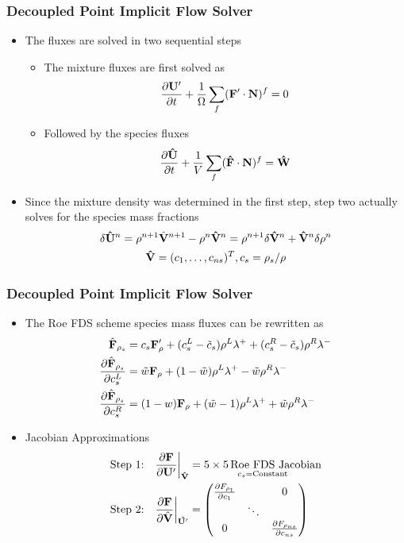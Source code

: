 \documentclass{beamer}
\begin{document}
\begin{frame}
  \frametitle{Decoupled Point Implicit Flow Solver}
  \begin{itemize}
    \item The fluxes are solved in two sequential steps
      \begin{itemize}
        \item  The mixture fluxes are first solved as
        \[
          \frac{\partial \mathbf U'}{\partial t} +
          \frac{1}{\Omega}\sum\limits_{f}(\mathbf F'\cdot\mathbf{N})^f = 0
        \]
      \item Followed by the species fluxes
      \[
        \frac{\partial \mathbf{\hat{U}}}{\partial t} +
        \frac{1}{V}\sum\limits_{f}(\mathbf{\hat{F}}\cdot \mathbf{N})^f =
        \mathbf{\hat{W}}
      \]
    \end{itemize}
    \item Since the mixture density was determined in the first step, step two
      actually solves for the species mass fractions
      \begin{gather*}
        \delta \mathbf{\hat{U}}^n 
        = \rho^{n+1} \hat{\mathbf V}^{n+1}-\rho^n\mathbf{\hat{V}}^n = \rho^{n+1} \delta
        \mathbf{\hat{V}}^n + \mathbf{\hat{V}}^n \delta \rho^n \\
        \mathbf{\hat{V}}=(c_1,\hdots,c_{ns})^T, c_s=\rho_s/\rho
      \end{gather*}
  \end{itemize}
\end{frame}
\begin{frame}
  \frametitle{Decoupled Point Implicit Flow Solver}
  \begin{itemize}
    \item The Roe FDS scheme species mass fluxes can be rewritten as
      \begin{align*}
  	\hat{\mathbf F}_{\rho_s} &= c_s \mathbf F'_\rho+(c_s^L-\tilde{c}_s)\rho^L\lambda^+
  	+ (c_s^R-\tilde{c}_s)\rho^R\lambda^- \\
	\frac{\partial \hat{\mathbf F}_{\rho_s}}{\partial c_s^L} 
	&= \tilde{w} \mathbf F_\rho+(1-\tilde{w})\rho^L\lambda^+ - \tilde{w} \rho^R\lambda^- \\
	\frac{\partial \hat{\mathbf F}_{\rho_s}}{\partial c_s^R} 
	&= (1-w)\mathbf F_\rho+(\tilde{w}-1)\rho^L\lambda^+ + \tilde{w} \rho^R\lambda^- \label{d_last}
      \end{align*}
    \item Jacobian Approximations
      \begin{align*}
	\text{Step 1:}\quad &
	\frac{\partial \mathbf F}{\partial \mathbf U'}\bigg|_{\mathbf{\hat{V}}} =
	\underset{c_s = \text{Constant}}{5 \times 5\,\text{Roe FDS Jacobian}} \\
	\text{Step 2:}\quad & 
	\frac{\partial \mathbf F}{\partial \hat{\mathbf V}}\bigg|_{\mathbf{\hat{U'}}} = 
        \begin{pmatrix} 
          \frac{\partial F_{\rho_1}}{\partial c_1} & & 0
          \\ & \ddots &  \\ 0 & & \frac{\partial F_{\rho_{ns}}}{\partial c_{ns}}
        \end{pmatrix} 
      \end{align*}
  \end{itemize}
\end{frame}
\end{document}
